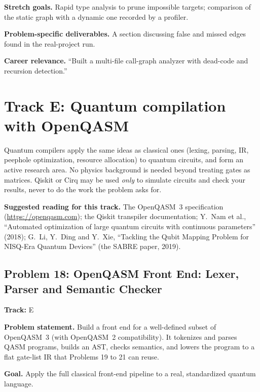 \documentclass[11pt,a4paper]{article}
\newcommand{\fld}[1]{\par\smallskip\textbf{\color{accent}#1}\quad}
\newcommand{\meta}[1]{%
  \begin{tcolorbox}[colback=softbg,colframe=softbg,boxsep=2pt,left=4pt,right=4pt,top=2pt,bottom=2pt,arc=2pt]
  \small\textbf{Track:} #1
  \end{tcolorbox}}
\begin{document}
\fld{Stretch goals.} Rapid type analysis to prune impossible targets; comparison of the static graph
with a dynamic one recorded by a profiler.

\fld{Problem-specific deliverables.} A section discussing false and missed edges found in the real-project run.

\fld{Career relevance.} ``Built a multi-file call-graph analyzer with dead-code and recursion detection.''

\section{Track E: Quantum compilation with OpenQASM}

Quantum compilers apply the same ideas as classical ones (lexing, parsing, IR, peephole optimization,
resource allocation) to quantum circuits, and form an active research area. No physics background is
needed beyond treating gates as matrices. Qiskit or Cirq may be used \emph{only} to simulate circuits
and check your results, never to do the work the problem asks for.

\textbf{Suggested reading for this track.} The OpenQASM~3 specification (\url{https://openqasm.com});
the Qiskit transpiler documentation; Y.~Nam et al., ``Automated optimization of large quantum
circuits with continuous parameters'' (2018); G.~Li, Y.~Ding and Y.~Xie, ``Tackling the Qubit Mapping
Problem for NISQ-Era Quantum Devices'' (the SABRE paper, 2019).

\subsection{Problem 18: OpenQASM Front End: Lexer, Parser and Semantic Checker}
\meta{E}

\fld{Problem statement.} Build a front end for a well-defined subset of OpenQASM~3 (with
OpenQASM~2 compatibility). It tokenizes and parses QASM programs, builds an AST, checks semantics, and
lowers the program to a flat gate-list IR that Problems 19 to 21 can reuse.

\fld{Goal.} Apply the full classical front-end pipeline to a real, standardized quantum language.
\end{document}
